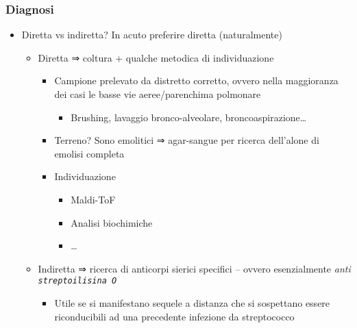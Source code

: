\documentclass[italian,]{article}
\providecommand{\tightlist}{%
  \setlength{\itemsep}{0pt}\setlength{\parskip}{0pt}}
\begin{document}
\hypertarget{diagnosi}{%
\subsubsection{Diagnosi}\label{diagnosi}}

\begin{itemize}
\tightlist
\item
  Diretta vs indiretta? In acuto preferire diretta (naturalmente)

  \begin{itemize}
  \tightlist
  \item
    Diretta ⇒ coltura + qualche metodica di individuazione

    \begin{itemize}
    \tightlist
    \item
      Campione prelevato da distretto corretto, ovvero nella maggioranza
      dei casi le basse vie aeree/parenchima polmonare

      \begin{itemize}
      \tightlist
      \item
        Brushing, lavaggio bronco-alveolare, broncoaspirazione\ldots{}
      \end{itemize}
    \item
      Terreno? Sono emolitici ⇒ agar-sangue per ricerca dell'alone di
      emolisi completa
    \item
      Individuazione

      \begin{itemize}
      \tightlist
      \item
        Maldi-ToF
      \item
        Analisi biochimiche
      \item
        \ldots{}
      \end{itemize}
    \end{itemize}
  \item
    Indiretta ⇒ ricerca di anticorpi sierici specifici -- ovvero
    esenzialmente \emph{anti \texttt{streptoilisina\ O}}

    \begin{itemize}
    \tightlist
    \item
      Utile se si manifestano sequele a distanza che si sospettano
      essere riconducibili ad una precedente infezione da streptococco
    \end{itemize}
  \end{itemize}
\end{itemize}
\end{document}
